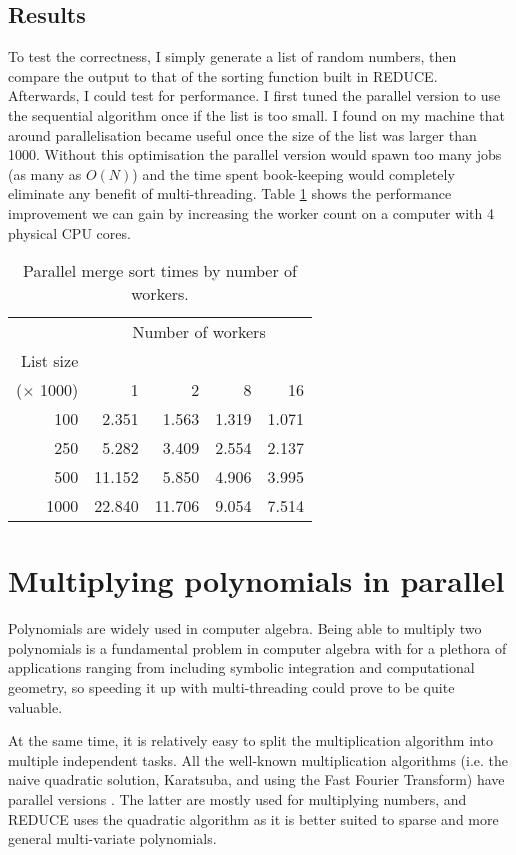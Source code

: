 \subsection{Results}

To test the correctness, I simply generate a list of random numbers, then compare the output
to that of the sorting function built in REDUCE. Afterwards, I could test for performance.
I first tuned the parallel version to use the sequential algorithm once if the list is too
small. I found on my machine that around parallelisation became useful once the size of
the list was larger than 1000. Without this optimisation
the parallel version would spawn too many jobs (as many as \(O(N)\)) and the time spent book-keeping
would completely eliminate any benefit of multi-threading.
Table \ref{table:parmergesort} shows the performance improvement
we can gain by increasing the worker count on a computer with 4 physical CPU cores.

\begin{table}[H]
\centering
\begin{tabular}{rrrrr}
& \multicolumn{4}{c}{Number of workers} \\
List size & & & \\
($\times$ 1000) & 1 & 2 & 8 & 16\\
\hline
100  & 2.351 & 1.563 & 1.319 & 1.071 \\
250  & 5.282 & 3.409 & 2.554 & 2.137 \\
500  & 11.152 &  5.850 & 4.906 & 3.995 \\
1000 & 22.840 & 11.706 & 9.054 & 7.514 \\
\end{tabular}
\caption{Parallel merge sort times by number of workers.}
\label{table:parmergesort}
\end{table}

\section{Multiplying polynomials in parallel}

Polynomials are widely used in computer algebra. Being able
to multiply two polynomials is a fundamental problem in computer
algebra with for a plethora of applications ranging from
including symbolic integration and computational geometry,
so speeding it up with multi-threading could prove to be quite valuable.

At the same time, it is relatively easy to split the multiplication
algorithm into multiple independent tasks. All the well-known
multiplication algorithms (i.e. the naive quadratic solution, Karatsuba,
and using the Fast Fourier Transform) have parallel versions \cite[Chapter~30.3]{cormen}.
The latter are mostly used for multiplying numbers, and REDUCE
uses the quadratic algorithm as it is better suited to sparse and
more general multi-variate polynomials.

